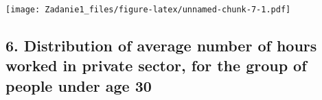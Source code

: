 \documentclass[]{article}
\newenvironment{Shaded}{\begin{snugshade}}{\end{snugshade}}
\newcommand{\DataTypeTok}[1]{\textcolor[rgb]{0.13,0.29,0.53}{#1}}
\newcommand{\KeywordTok}[1]{\textcolor[rgb]{0.13,0.29,0.53}{\textbf{#1}}}
\newcommand{\NormalTok}[1]{#1}
\newcommand{\OperatorTok}[1]{\textcolor[rgb]{0.81,0.36,0.00}{\textbf{#1}}}
\newcommand{\StringTok}[1]{\textcolor[rgb]{0.31,0.60,0.02}{#1}}
\begin{document}
\begin{Shaded}
\end{Shaded}

\texttt{[image: Zadanie1\_files/figure-latex/unnamed-chunk-7-1.pdf]}

\hypertarget{distribution-of-average-number-of-hours-worked-in-private-sector-for-the-group-of-people-under-age-30}{%
\subsection{6. Distribution of average number of hours worked in private
sector, for the group of people under age
30}\label{distribution-of-average-number-of-hours-worked-in-private-sector-for-the-group-of-people-under-age-30}}
\end{document}
